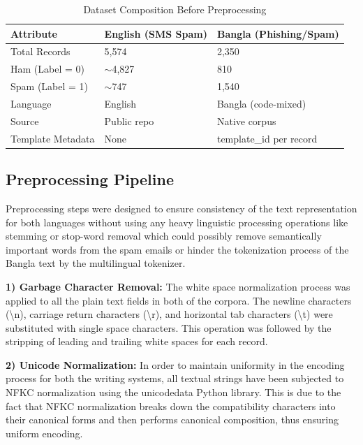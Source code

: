 \documentclass[journal]{IEEEtran}
\begin{document}
\begin{table}[htbp]
\caption{Dataset Composition Before Preprocessing}
\label{tab:dataset_raw}
\begin{center}
\begin{tabular}{lll}
\toprule
\textbf{Attribute} & \textbf{English (SMS Spam)} & \textbf{Bangla (Phishing/Spam)} \\
\midrule
Total Records & 5,574 & 2,350 \\
Ham (Label = 0) & $\sim$4,827 & 810 \\
Spam (Label = 1) & $\sim$747 & 1,540 \\
Language & English & Bangla (code-mixed) \\
Source & Public repo \cite{ref1} & Native corpus \\
Template Metadata & None & template\_id per record \\
\bottomrule
\end{tabular}
\end{center}
\end{table}

\subsection{Preprocessing Pipeline}

Preprocessing steps were designed to ensure consistency of the text
representation for both languages without using any heavy linguistic
processing operations like stemming or stop-word removal which could
possibly remove semantically important words from the spam emails or
hinder the tokenization process of the Bangla text by the multilingual
tokenizer.

\textbf{1) Garbage Character Removal:} The white space normalization process
was applied to all the plain text fields in both of the corpora. The
newline characters (\textbackslash n), carriage return characters (\textbackslash r), and horizontal tab
characters (\textbackslash t) were substituted with single space characters. This
operation was followed by the stripping of leading and trailing white
spaces for each record.

\textbf{2) Unicode Normalization:} In order to maintain uniformity in the
encoding process for both the writing systems, all textual strings have
been subjected to NFKC normalization using the unicodedata Python
library. This is due to the fact that NFKC normalization breaks down the
compatibility characters into their canonical forms and then performs
canonical composition, thus ensuring uniform encoding.
\end{document}
